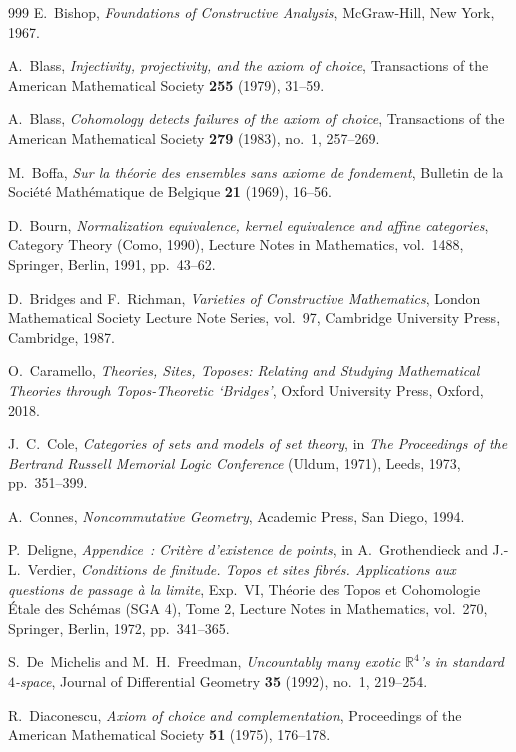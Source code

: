 \begin{thebibliography}{999}
E.~Bishop,
\emph{Foundations of Constructive Analysis},
McGraw-Hill, New York, 1967.

A.~Blass,
\emph{Injectivity, projectivity, and the axiom of choice},
Transactions of the American Mathematical Society \textbf{255} (1979), 31--59.

A.~Blass,
\emph{Cohomology detects failures of the axiom of choice},
Transactions of the American Mathematical Society \textbf{279} (1983), no.~1, 257--269.

M.~Boffa,
\emph{Sur la th\'eorie des ensembles sans axiome de fondement},
Bulletin de la Soci\'et\'e Math\'ematique de Belgique \textbf{21} (1969), 16--56.

D.~Bourn,
\emph{Normalization equivalence, kernel equivalence and affine categories},
Category Theory (Como, 1990), Lecture Notes in Mathematics, vol.~1488, Springer, Berlin, 1991, pp.~43--62.

D.~Bridges and F.~Richman,
\emph{Varieties of Constructive Mathematics},
London Mathematical Society Lecture Note Series, vol.~97, Cambridge University Press, Cambridge, 1987.

O.~Caramello,
\emph{Theories, Sites, Toposes: Relating and Studying Mathematical Theories through Topos-Theoretic `Bridges'},
Oxford University Press, Oxford, 2018.

J.~C.~Cole,
\emph{Categories of sets and models of set theory},
in \emph{The Proceedings of the Bertrand Russell Memorial Logic Conference} (Uldum, 1971), Leeds, 1973, pp.~351--399.

A.~Connes,
\emph{Noncommutative Geometry},
Academic Press, San Diego, 1994.

P.~Deligne,
\emph{Appendice~: Crit\`ere d'existence de points},
in A.~Grothendieck and J.-L.~Verdier, \emph{Conditions de finitude. Topos et sites fibr\'es. Applications aux questions de passage \`a la limite}, Exp.~VI, Th\'eorie des Topos et Cohomologie \'Etale des Sch\'emas (SGA 4), Tome 2, Lecture Notes in Mathematics, vol.~270, Springer, Berlin, 1972, pp.~341--365.

S.~De~Michelis and M.~H.~Freedman,
\emph{Uncountably many exotic $\mathbb{R}^4$'s in standard $4$-space},
Journal of Differential Geometry \textbf{35} (1992), no.~1, 219--254.

R.~Diaconescu,
\emph{Axiom of choice and complementation},
Proceedings of the American Mathematical Society \textbf{51} (1975), 176--178.


\end{thebibliography}
